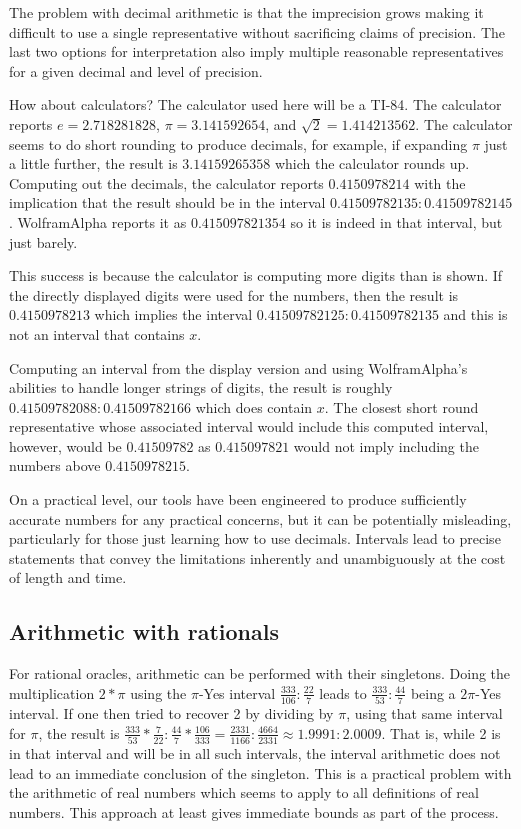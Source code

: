 \documentclass[12pt]{article}
\begin{document}
The problem with decimal arithmetic is that the imprecision grows making it difficult to use a single representative without sacrificing claims of precision. The last two options for interpretation also imply multiple reasonable representatives for a given decimal and level of precision. 

How about calculators? The calculator used here will be a TI-84. The calculator reports  $e = 2.718281828$, $\pi = 3.141592654$, and $\sqrt{2} = 1.414213562$. The calculator seems to do short rounding to produce decimals, for example, if expanding $\pi $ just a little further, the result is  $3.14159265358$ which the calculator rounds up. Computing out the decimals, the calculator reports $0.4150978214$ with the implication that the result should be in the interval $0.41509782135:0.41509782145$.  WolframAlpha reports it as $0.415097821354$ so it is indeed in that interval, but just barely. 

This success is because the calculator is computing more digits than is shown. If the directly displayed digits were used for the numbers, then the result is $0.4150978213$ which implies the interval $0.41509782125:0.41509782135$ and this is not an interval that contains $x$. 

Computing an interval from the display version and using WolframAlpha's abilities to handle longer strings of digits, the result is roughly $0.41509782088:0.41509782166$ which does contain $x$. The closest short round representative whose associated interval  would include this computed interval, however, would be $0.41509782$ as $0.415097821$ would not imply including the numbers above $0.4150978215$. 

On a practical level, our tools have been engineered to produce sufficiently accurate numbers for any practical concerns, but it can be potentially misleading, particularly for those just learning how to use decimals. Intervals lead to precise statements that convey the limitations inherently and unambiguously at the cost of length and time.  

\subsection{Arithmetic with rationals}

For rational oracles, arithmetic can be performed with their singletons. Doing the multiplication $2 * \pi$ using the $\pi$-Yes interval $\frac{333}{106}: \frac{22}{7}$ leads to $\frac{333}{53}: \frac{44}{7}$ being a $2 \pi$-Yes interval. If one then tried to recover 2 by dividing  by $\pi$, using that same interval for $\pi$, the result is $\frac{333}{53} * \frac{7}{22}: \frac{44}{7} * \frac{106}{333} = \frac{2331}{1166}: \frac{4664}{2331} \approx 1.9991: 2.0009$. That is, while 2 is in that interval and will be in all such intervals, the interval arithmetic does not lead to an immediate conclusion of the singleton. This is a practical problem with the arithmetic of real numbers which seems to apply to all definitions of real numbers. This approach at least gives immediate bounds as part of the process.
\end{document}
